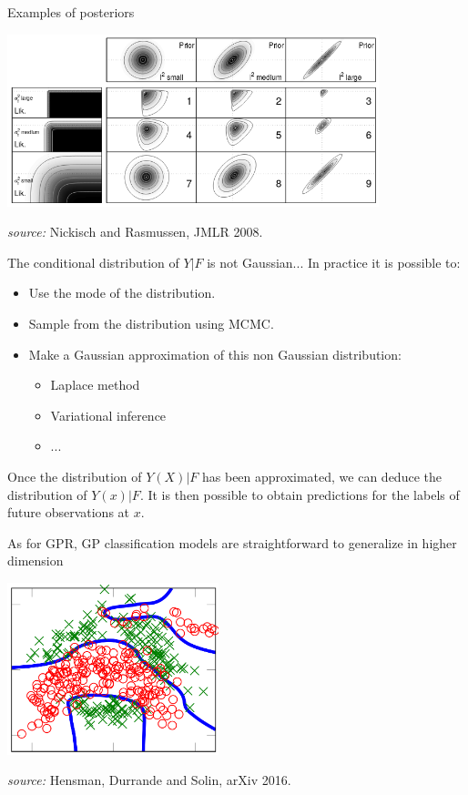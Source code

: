 \documentclass{beamer}
\begin{document}
\begin{frame}{}
Examples of posteriors
\begin{center}
 \includegraphics[height=5cm]{figures/classif_post}
\end{center}
\begin{flushright}
{\small \emph{source:} Nickisch and Rasmussen, JMLR 2008.}
\end{flushright}
\end{frame}

\begin{frame}{}
The conditional distribution of $Y|F$ is not Gaussian... In practice it is possible to:
\begin{itemize}
	\item Use the mode of the distribution.
	\item Sample from the distribution using MCMC.
	\item Make a Gaussian approximation of this non Gaussian distribution:
	\begin{itemize}
		\item Laplace method
		\item Variational inference
		\item ...
	\end{itemize}
\end{itemize}
Once the distribution of $Y(X)|F$ has been approximated, we can deduce the distribution of $Y(x)|F$. It is then possible to obtain predictions for the labels of future observations at $x$.
\end{frame}


\begin{frame}{}
As for GPR, GP classification models are straightforward to generalize in higher dimension
\begin{center}
 \includegraphics[height=5cm]{figures/classif_2d}
\end{center}
\begin{flushright}
{\small \emph{source:} Hensman, Durrande and Solin, arXiv 2016.}
\end{flushright}
\end{frame}
\end{document}

